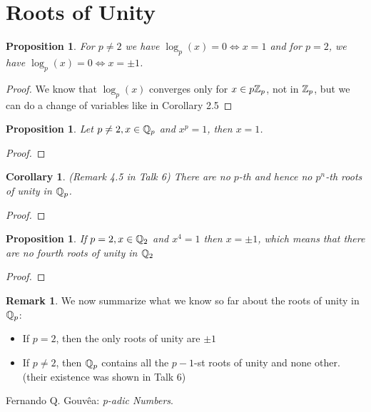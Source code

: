 \documentclass[a4paper]{article}
\theoremstyle{plain}
\newtheorem{prop}[thm]{Proposition}
\newtheorem{Cor}[thm]{Corollary}
\theoremstyle{definition}
\newtheorem{rem}[thm]{Remark}
\begin{document}
\section{Roots of Unity}
\begin{prop}
  For $p \neq 2$ we have $\log_{p}(x)=0 \iff x=1$ and for $p = 2$, we have $\log_{p}(x)=0 \iff x= \pm 1$.
\end{prop}
\begin{proof}
  We know that $\log_{p}(x)$ converges only for $x \in p\Bbb Z_{p}$, not in $\Bbb Z_{p}$, but we can do a change of variables like in Corollary 2.5
\end{proof}
\begin{prop}
  Let $p \neq 2, x \in \Bbb Q_{p}$ and $x^{p}=1$, then $x=1$.
\end{prop}
\begin{proof}
\end{proof}
\begin{Cor}
  (Remark 4.5 in Talk 6) There are no $p$-th and hence no $p^{n}$-th roots of unity in $\Bbb Q_{p}$.
\end{Cor}
\begin{proof}
\end{proof}
\begin{prop} If $p = 2, x \in \Bbb Q_{2}$ and $x^{4} = 1$ then $x = \pm 1$, which means that there are no fourth roots of unity in $\Bbb Q_{2}$
\end{prop}
\begin{proof}
\end{proof}
\begin{rem}
  We now summarize what we know so far about the roots of unity in $\Bbb Q_{p}$:
  \begin{itemize}
    \item If $p=2$, then the only roots of unity are $\pm 1$
    \item If $p \neq 2$, then $\Bbb Q_{p}$ contains all the $p-1$-st roots of unity and none other. (their existence was shown in Talk 6)
  \end{itemize}

\end{rem}

\begin{thebibliography}{widest-label} %

	Fernando Q. Gouv\^{e}a:
	\emph{p-adic Numbers}.


\end{thebibliography}
\end{document}
